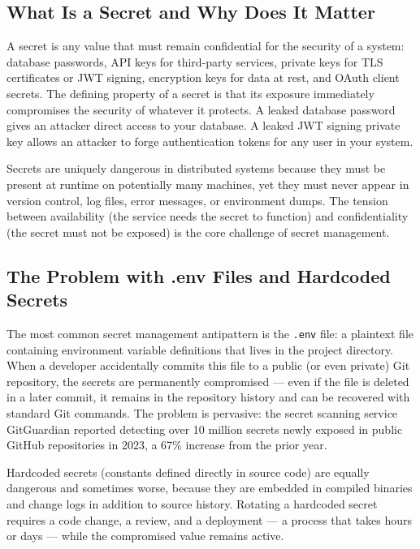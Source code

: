 \documentclass[11pt,a4paper]{article}
\begin{document}
\subsection{What Is a Secret and Why Does It Matter}

A secret is any value that must remain confidential for the security of a system: database passwords, API keys for third-party services, private keys for TLS certificates or JWT signing, encryption keys for data at rest, and OAuth client secrets. The defining property of a secret is that its exposure immediately compromises the security of whatever it protects. A leaked database password gives an attacker direct access to your database. A leaked JWT signing private key allows an attacker to forge authentication tokens for any user in your system.

Secrets are uniquely dangerous in distributed systems because they must be present at runtime on potentially many machines, yet they must never appear in version control, log files, error messages, or environment dumps. The tension between availability (the service needs the secret to function) and confidentiality (the secret must not be exposed) is the core challenge of secret management.

\subsection{The Problem with .env Files and Hardcoded Secrets}

The most common secret management antipattern is the \texttt{.env} file: a plaintext file containing environment variable definitions that lives in the project directory. When a developer accidentally commits this file to a public (or even private) Git repository, the secrets are permanently compromised --- even if the file is deleted in a later commit, it remains in the repository history and can be recovered with standard Git commands. The problem is pervasive: the secret scanning service GitGuardian reported detecting over 10 million secrets newly exposed in public GitHub repositories in 2023, a 67\% increase from the prior year.

Hardcoded secrets (constants defined directly in source code) are equally dangerous and sometimes worse, because they are embedded in compiled binaries and change logs in addition to source history. Rotating a hardcoded secret requires a code change, a review, and a deployment --- a process that takes hours or days --- while the compromised value remains active.
\end{document}
